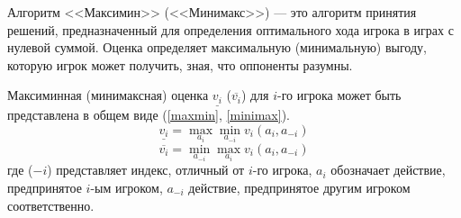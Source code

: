 Алгоритм <<Максимин>> (<<Минимакс>>) --- это алгоритм принятия решений, предназначенный для определения оптимального хода игрока в играх с нулевой суммой. Оценка определяет максимальную (минимальную) выгоду, которую игрок может получить, зная, что оппоненты разумны.

Максиминная (минимаксная) оценка $\underline{v_i}$ ($\overline{v_i}$) для $i$-го игрока может быть представлена в общем виде (\ref{maxmin}, \ref{minimax}).
\begin{equation}\label{maxmin}
    \underline{v_i} = \max_{a_i} \min_{a_{-i}} v_i(a_i, a_{-i})
\end{equation}
\begin{equation}\label{minimax}
    \overline{v_i} = \min_{a_{-i}} \max_{a_i} v_i(a_i, a_{-i})
\end{equation}
где ($-i$) представляет индекс, отличный от $i$-го игрока, $a_i$ обозначает действие, предпринятое $i$-ым игроком, $a_{-i}$ действие, предпринятое другим игроком соответственно.
